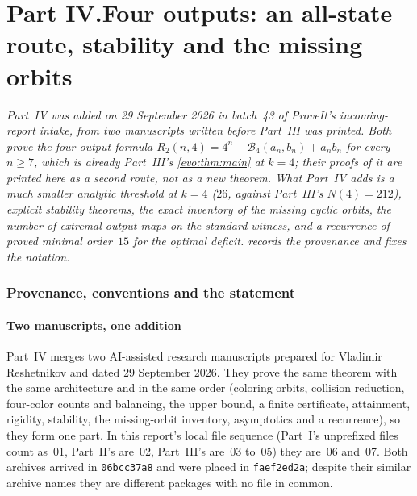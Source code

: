 \documentclass[11pt,a4paper]{article}
\numberwithin{equation}{section}
\theoremstyle{definition}
\theoremstyle{remark}
\newcommand{\Bip}{\mathcal B}
\begin{document}
\endgroup
\clearpage
\begingroup
\renewcommand{\UrlBreaks}{\do\.\do\@\do\\\do\/\do\!\do\_\do\|\do\;\do\>\do\]\do\)\do\,\do\?\do\'\do+\do\=\do\#\do\-}
\part*{Part IV.\quad Four outputs: an all-state route, stability and the missing orbits}

\noindent\emph{Part~IV was added on 29 September 2026 in batch~43 of
ProveIt's incoming-report intake, from two manuscripts written before
Part~III was printed. Both prove the four-output formula
$R_2(n,4)=4^n-\Bip_4(a_n,b_n)+a_nb_n$ for every $n\ge7$, which is already
Part~III's \cref{evo:thm:main} at $k=4$; their proofs of it are printed here
as a second route, not as a new theorem. What Part~IV adds is a much smaller
analytic threshold at $k=4$ ($26$, against Part~III's $N(4)=212$), explicit
stability theorems, the exact inventory of the missing cyclic orbits, the
number of extremal output maps on the standard witness, and a recurrence of
proved minimal order~$15$ for the optimal deficit.
 records the provenance and fixes the notation.}

\section{Provenance, conventions and the statement}\label{fo:sec:intro}

\subsection{Two manuscripts, one addition}\label{fo:sec:source}

Part~IV merges two AI-assisted research manuscripts prepared for Vladimir
Reshetnikov and dated 29 September 2026. They prove the same theorem with the
same architecture and in the same order (coloring orbits, collision reduction,
four-color counts and balancing, the upper bound, a finite certificate,
attainment, rigidity, stability, the missing-orbit inventory, asymptotics and
a recurrence), so they form one part. In this report's local file sequence
(Part~I's unprefixed files count as~01, Part~II's are~02, Part~III's are~03
to~05) they are~06 and~07. Both archives arrived in \texttt{06bcc37a8} and
were placed in \texttt{faef2ed2a}; despite their similar archive names they
are different packages with no file in common.
\end{document}
